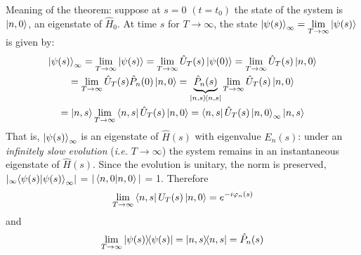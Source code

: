 \documentclass[12pt]{article}
\newcommand{\be}{\begin{equation}}
\newcommand{\ee}{\end{equation}}
\begin{document}
Meaning of the theorem: suppose at $s=0$ $(t=t_0)$ the
state of the system is $\ket{n,0}$, an eigenstate of $\hat{H}_0$. At time
$s$ for $T \to \infty$, the state $\displaystyle\ket{\psi(s)}_\infty = \lim_{T\to\infty} \ket{\psi(s)}$ is given by:
\be
\begin{gathered}
\ket{\psi(s)}_\infty = \lim_{T\to\infty} \ket{\psi(s)} = 
\lim_{T\to\infty} \hat{U}_{T}(s) \ket{\psi(0)} = \lim_{T\to\infty} \hat{U}_{T}(s) \ket{n,0}\\
= \lim_{T\to\infty} \hat{U}_{T}(s) \hat{P}_{n}(0) \ket{n,0} = \underbrace{\hat{P}_{n}(s)}_{\op{n,s}} \lim_{T\to\infty} \hat{U}_{T}(s) \ket{n,0}\\
= \ket{n,s} \lim_{T\to\infty} \bra{n,s} \hat{U}_{T}(s) \ket{n,0} = \bra{n,s} \hat{U}_{T}(s) \ket{n,0}_\infty \ket{n,s}
\end{gathered}
\ee
That is, $\ket{\psi(s)}_\infty$ is an eigenstate of $\hat{H}(s)$ with eigenvalue
$E_n(s)$: under an \emph{infinitely slow evolution} (\textit{i.e.} $T\to\infty$)
the system remains in an instantaneous eigenstate
of $\hat{H}(s)$. Since the evolution is unitary, the norm is
preserved, $|{}_\infty\!\bra{\psi(s)}\ket{\psi(s)}_\infty\!|$ = $|\bra{n,0}\ket{n,0}|$ = 1. Therefore
\be
\lim_{T\to\infty} \bra{n,s}U_{T}(s)\ket{n,0} = e^{-i\varphi_n(s)}
\ee
and
\be
\lim_{T\to\infty} \op{\psi(s)} = \op{n,s} = \hat{P}_n(s)
\ee
\end{document}
